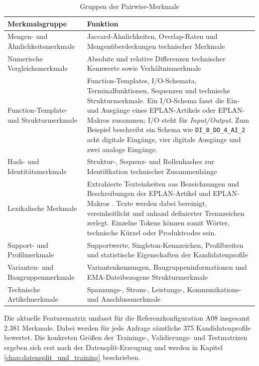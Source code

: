 \begin{table}[H] 
    \centering 
    \caption{Gruppen der Pairwise-Merkmale} 
    \label{tab:pairwise_merkmale} 
    \begin{tabularx}{\textwidth}{p{4cm}X} 
        \toprule 
        \textbf{Merkmalsgruppe} & \textbf{Funktion} \\ 
        \midrule 
        Mengen- und Ähnlichkeitsmerkmale & Jaccard-Ähnlichkeiten, Overlap-Raten und Mengenüberdeckungen technischer Merkmale \\ 
        Numerische Vergleichsmerkmale & Absolute und relative Differenzen technischer Kennwerte sowie Verhältnismerkmale \\ 
        Function-Template- und Strukturmerkmale & Function-Templates, I/O-Schemata, Terminalfunktionen, Sequenzen und technische Strukturmerkmale. Ein I/O-Schema fasst die Ein- und Ausgänge eines EPLAN-Artikels oder EPLAN-Makros zusammen; I/O steht für \textit{Input/Output}. Zum Beispiel beschreibt ein Schema wie \texttt{DI\_8\_DO\_4\_AI\_2} acht digitale Eingänge, vier digitale Ausgänge und zwei analoge Eingänge. \\
        Hash- und Identitätsmerkmale & Struktur-, Sequenz- und Rollenhashes zur Identifikation technischer Zusammenhänge \\ 
        Lexikalische Merkmale & Extrahierte Texteinheiten aus Bezeichnungen und Beschreibungen der EPLAN-Artikel \parencite{EPLANArtikelverwaltung} und EPLAN-Makros \parencite{EPLAN-Makros}. Texte werden dabei bereinigt, vereinheitlicht und anhand definierter Trennzeichen zerlegt. Einzelne Tokens können somit Wörter, technische Kürzel oder Produktcodes sein. \\
        Support- und Profilmerkmale & Supportwerte, Singleton-Kennzeichen, Profilbreiten und statistische Eigenschaften der Kandidatenprofile \\ 
        Varianten- und Baugruppenmerkmale & Variantenkennungen, Baugruppeninformationen und EMA-Dateibezogene Strukturmerkmale \\ 
        Technische Artikelmerkmale & Spannungs-, Strom-, Leistungs-, Kommunikations- und Anschlussmerkmale \\ 
        \bottomrule 
    \end{tabularx} 
\end{table}

Die aktuelle Featurematrix umfasst für die Referenzkonfiguration A08 insgesamt 2.381 Merkmale. Dabei werden für jede Anfrage sämtliche 375 Kandidatenprofile bewertet. 
Die konkreten Größen der Trainings-, Validierungs- und Testmatrizen ergeben sich erst nach der Datensplit-Erzeugung und werden in Kapitel \ref{chap:datensplit_und_training} beschrieben.

